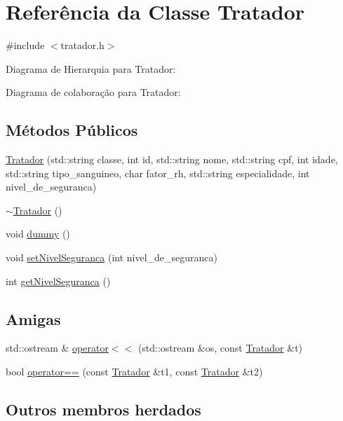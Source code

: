 \hypertarget{classTratador}{}\section{Referência da Classe Tratador}
\label{classTratador}


{\ttfamily \#include $<$tratador.\+h$>$}



Diagrama de Hierarquia para Tratador\+:


Diagrama de colaboração para Tratador\+:
\subsection*{Métodos Públicos}
\begin{DoxyCompactItemize}
\item 
\hyperlink{classTratador_a0b049deab10d9fbb4ed02659cb464650}{Tratador} (std\+::string classe, int id, std\+::string nome, std\+::string cpf, int idade, std\+::string tipo\+\_\+sanguineo, char fator\+\_\+rh, std\+::string especialidade, int nivel\+\_\+de\+\_\+seguranca)
\item 
\hyperlink{classTratador_a8750ed6960e786da5d6f87e05b491093}{$\sim$\+Tratador} ()
\item 
void \hyperlink{classTratador_a399c02d81fb4e7adaeda1d5e68afbca8}{dummy} ()
\item 
void \hyperlink{classTratador_a8d13e75b472634c87b517b1ee62694d2}{set\+Nivel\+Seguranca} (int nivel\+\_\+de\+\_\+seguranca)
\item 
int \hyperlink{classTratador_aad65cccc398a703dbe1351ee322a71fe}{get\+Nivel\+Seguranca} ()
\end{DoxyCompactItemize}
\subsection*{Amigas}
\begin{DoxyCompactItemize}
\item 
std\+::ostream \& \hyperlink{classTratador_aada884c6ae0506846e62abbc6a58ec54}{operator$<$$<$} (std\+::ostream \&os, const \hyperlink{classTratador}{Tratador} \&t)
\item 
bool \hyperlink{classTratador_ae50323b07338c89b5c0f5c7c93d022ae}{operator==} (const \hyperlink{classTratador}{Tratador} \&t1, const \hyperlink{classTratador}{Tratador} \&t2)
\end{DoxyCompactItemize}
\subsection*{Outros membros herdados}


